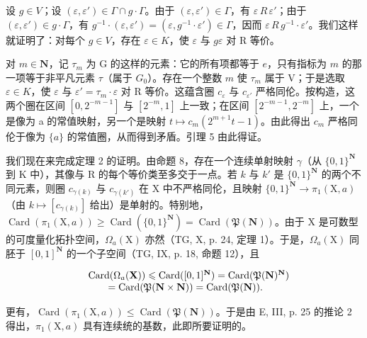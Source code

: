 设 \(g \in V\)；设 \((\varepsilon, \varepsilon') \in \Gamma \cap g \cdot \Gamma\)。由于 \((\varepsilon, \varepsilon') \in \Gamma\)，有 \(\varepsilon\,R\,\varepsilon'\)；由于 \((\varepsilon, \varepsilon') \in g \cdot \Gamma\)，有 \(g^{-1} \cdot (\varepsilon, \varepsilon') = (\varepsilon, g^{-1}\cdot\varepsilon') \in \Gamma\)，因而 \(\varepsilon\,R\,g^{-1}\cdot\varepsilon'\)。我们这样就证明了：对每个 \(g \in V\)，存在 \(\varepsilon \in K\)，使 \(\varepsilon\) 与 \(g\varepsilon\) 对 R 等价。

对 \(m \in \mathbf{N}\)，记 \(\tau_m\) 为 G 的这样的元素：它的所有项都等于 \(e\)，只有指标为 \(m\) 的那一项等于非平凡元素 \(\tau\)（属于 \(G_0\)）。存在一个整数 \(m\) 使 \(\tau_m\) 属于 V；于是选取 \(\varepsilon \in K\)，使 \(\varepsilon\) 与 \(\varepsilon' = \tau_m \cdot \varepsilon\) 对 R 等价。这蕴含圈 \(c_{\varepsilon}\) 与 \(c_{\varepsilon'}\) 严格同伦。按构造，这两个圈在区间 \([0, 2^{-m-1}]\) 与 \([2^{-m}, 1]\) 上一致；在区间 \([2^{-m-1}, 2^{-m}]\) 上，一个是像为 a 的常值映射，另一个是映射 \(t \mapsto c_{m}(2^{m+1}t - 1)\)。由此得出 \(c_{m}\) 严格同伦于像为 \(\{a\}\) 的常值圈，从而得到矛盾。引理 5 由此得证。

我们现在来完成定理 2 的证明。由命题 8，存在一个连续单射映射 \(\gamma\)（从 \(\{0,1\}^{\mathbf{N}}\) 到 K 中），其像与 R 的每个等价类至多交于一点。若 \(k\) 与 \(k'\) 是 \(\{0,1\}^{\mathbf{N}}\) 的两个不同元素，则圈 \(c_{\gamma(k)}\) 与 \(c_{\gamma(k')}\) 在 X 中不严格同伦，且映射 \(\{0,1\}^{\mathbf{N}} \to \pi_1(\mathrm{X},a)\)（由 \(k \mapsto [c_{\gamma(k)}]\) 给出）是单射的。特别地，\(\operatorname{Card}(\pi_1(\mathrm{X},a)) \geqslant \operatorname{Card}(\{0,1\}^{\mathbf{N}}) = \operatorname{Card}(\mathfrak{P}(\mathbf{N}))\)。由于 X 是可数型的可度量化拓扑空间，\(\Omega_a(\mathrm{X})\) 亦然（TG, X, p. 24, 定理 1）。于是，\(\Omega_a(\mathrm{X})\) 同胚于 \([0,1]^{\mathbf{N}}\) 的一个子空间（TG, IX, p. 18, 命题 12），且

\[
\begin{array}{r l} & {\mathrm{Card} (\Omega_ {a} (\mathbf {X})) \leqslant \mathrm{Card} ([ 0, 1 ] ^ {\mathbf {N}}) = \mathrm{Card} (\mathfrak {P} (\mathbf {N}) ^ {\mathbf {N}})} \\ & {\qquad = \mathrm{Card} (\mathfrak {P} (\mathbf {N} \times \mathbf {N})) = \mathrm{Card} (\mathfrak {P} (\mathbf {N})).} \end{array}
\]

更有，\(\operatorname{Card}(\pi_{1}(\mathrm{X},a))\leqslant\operatorname{Card}(\mathfrak{P}(\mathbf{N}))\)。于是由 E, III, p. 25 的推论 2 得出，\(\pi_{1}(\mathrm{X},a)\) 具有连续统的基数，此即所要证明的。

